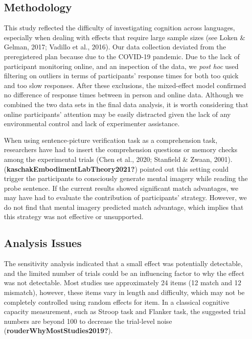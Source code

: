 \documentclass[
  man]{apa7}
\begin{document}
\hypertarget{methodology}{%
\subsection{Methodology}\label{methodology}}

This study reflected the difficulty of investigating cognition across languages, especially when dealing with effects that require large sample sizes (see Loken \& Gelman, 2017; Vadillo et al., 2016). Our data collection deviated from the preregistered plan because due to the COVID-19 pandemic. Due to the lack of participant monitoring online, and an inspection of the data, we \emph{post hoc} used filtering on outliers in terms of participants' response times for both too quick and too slow responses. After these exclusions, the mixed-effect model confirmed no difference of response times between in person and online data. Although we combined the two data sets in the final data analysis, it is worth considering that online participants' attention may be easily distracted given the lack of any environmental control and lack of experimenter assistance.

When using sentence-picture verification task as a comprehension task, researchers have had to insert the comprehension questions or memory checks among the experimental trials (Chen et al., 2020; Stanfield \& Zwaan, 2001). (\textbf{kaschakEmbodimentLabTheory2021?}) pointed out this setting could trigger the participants to consciously generate mental imagery while reading the probe sentence. If the current results showed significant match advantages, we may have had to evaluate the contribution of participants' strategy. However, we do not find that mental imagery predicted match advantage, which implies that this strategy was not effective or unsupported.

\hypertarget{analysis-issues}{%
\subsection{Analysis Issues}\label{analysis-issues}}

The sensitivity analysis indicated that a small effect was potentially detectable, and the limited number of trials could be an influencing factor to why the effect was not detectable. Most studies use approximately 24 items (12 match and 12 mismatch), however, these items vary in length and difficulty, which may not be completely controlled using random effects for item. In a classical cognitive capacity measurement, such as Stroop task and Flanker task, the suggested trial numbers are beyond 100 to decrease the trial-level noise (\textbf{rouderWhyMostStudies2019?}).
\end{document}
